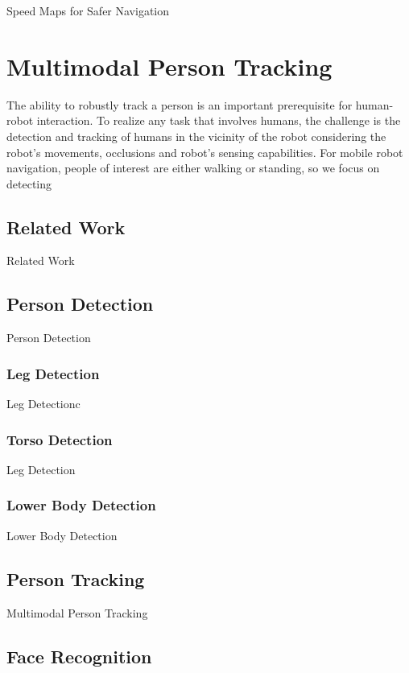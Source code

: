 \documentclass[12pt]{gatech-thesis}
\begin{document}
Speed Maps for Safer Navigation

\chapter{Multimodal Person Tracking}

The ability to robustly track a person is an important prerequisite for human-robot interaction. To realize any task that involves humans, the challenge is the detection and tracking of humans in the vicinity of the robot considering the robot's movements, occlusions and robot's sensing capabilities. For mobile robot navigation, people of interest are either walking or standing, so we focus on detecting 

\section{Related Work}

Related Work

\section{Person Detection}

Person Detection

\subsection{Leg Detection}

Leg Detectionc  

\subsection{Torso Detection}

Leg Detection

\subsection{Lower Body Detection}

Lower Body Detection

\section{Person Tracking}

Multimodal Person Tracking

\section{Face Recognition}
\end{document}
